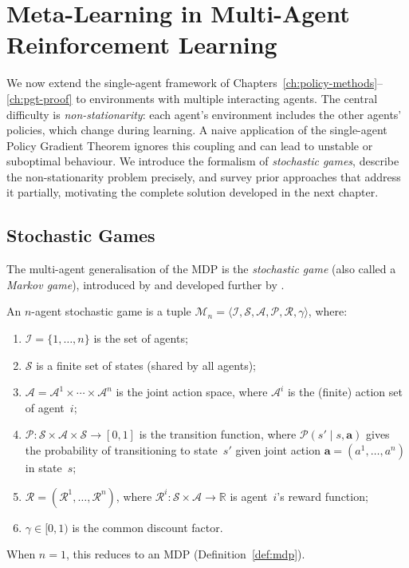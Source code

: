 
\chapter{Meta-Learning in Multi-Agent Reinforcement Learning}
\label{ch:meta-learning}

We now extend the single-agent framework of Chapters~\ref{ch:policy-methods}--\ref{ch:pgt-proof} to environments with multiple interacting agents. The central difficulty is \emph{non-stationarity}: each agent's environment includes the other agents' policies, which change during learning. A naive application of the single-agent Policy Gradient Theorem ignores this coupling and can lead to unstable or suboptimal behaviour. We introduce the formalism of \emph{stochastic games}, describe the non-stationarity problem precisely, and survey prior approaches that address it partially, motivating the complete solution developed in the next chapter.

\section{Stochastic Games}
\label{sec:stochastic-games}

The multi-agent generalisation of the MDP is the \emph{stochastic game} (also called a \emph{Markov game}), introduced by \cite{shapley1953} and developed further by \cite{littman1994}.

\begin{definition}\label{def:stochastic-game}
An $n$-agent stochastic game is a tuple $\mathcal{M}_n = \langle \mathcal{I},\mathcal{S},\bm{\mathcal{A}},\mathcal{P},\bm{\mathcal{R}},\gamma\rangle$, where:
\begin{enumerate}[label=(\roman*)]
  \item $\mathcal{I}=\{1,\ldots,n\}$ is the set of agents;
  \item $\mathcal{S}$ is a finite set of states (shared by all agents);
  \item $\bm{\mathcal{A}}=\mathcal{A}^1\times\cdots\times\mathcal{A}^n$ is the joint action space, where $\mathcal{A}^i$ is the (finite) action set of agent~$i$;
  \item $\mathcal{P}\colon\mathcal{S}\times\bm{\mathcal{A}}\times\mathcal{S}\to[0,1]$ is the transition function, where $\mathcal{P}(s'\mid s,\bm{a})$ gives the probability of transitioning to state~$s'$ given joint action $\bm{a}=(a^1,\ldots,a^n)$ in state~$s$;
  \item $\bm{\mathcal{R}}=(\mathcal{R}^1,\ldots,\mathcal{R}^n)$, where $\mathcal{R}^i\colon\mathcal{S}\times\bm{\mathcal{A}}\to\mathbb{R}$ is agent~$i$'s reward function;
  \item $\gamma\in[0,1)$ is the common discount factor.
\end{enumerate}
When $n=1$, this reduces to an MDP (Definition~\ref{def:mdp}).
\end{definition}

